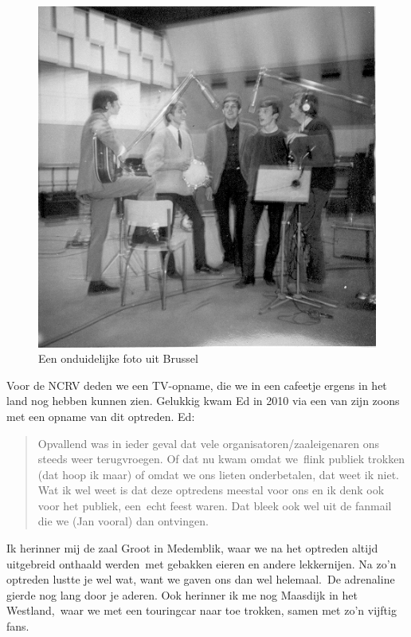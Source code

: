 \documentclass[12pt,twoside, openright]{memoir}
\begin{document}
\begin{figure}
\centering
\includegraphics[width=\textwidth]{img/4-08-BrusselA}
\caption*{\footnotesize Een onduidelijke foto uit Brussel}
\end{figure}

Voor de NCRV deden we een TV-opname, die we in een cafeetje ergens in het land nog hebben kunnen zien. Gelukkig kwam Ed in 2010 via een van zijn zoons met een opname van dit optreden. Ed: 

\begin{quote}
Opvallend was in ieder geval dat vele organisatoren/zaaleigenaren ons steeds weer terugvroegen. Of dat nu kwam omdat we flink publiek trokken (dat hoop ik maar) of omdat we ons lieten onderbetalen, dat weet ik niet. Wat ik wel weet is dat deze optredens meestal voor ons en ik denk ook voor het publiek, een echt feest waren. Dat bleek ook wel uit de fanmail die we (Jan vooral) dan ontvingen.
\end{quote}

Ik herinner mij de zaal Groot in Medemblik, waar we na het optreden altijd uitgebreid onthaald werden met gebakken eieren en andere lekkernijen. Na zo'n optreden lustte je wel wat, want we gaven ons dan wel helemaal. De adrenaline gierde nog lang door je aderen. Ook herinner ik me nog Maasdijk in het Westland, waar we met een touringcar naar toe trokken, samen met zo'n vijftig fans. 
\end{document}
